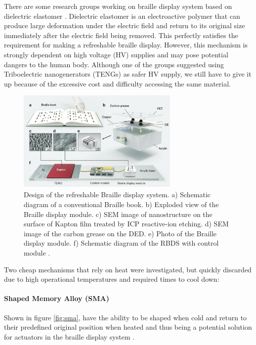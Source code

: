 There are some research groups working on braille display system based on dielectric elastomer \cite{qu_refreshable_2021}.
Dielectric elastomer is an electroactive polymer that can produce large deformation under the electric field and return to its original size immediately after the electric field being removed.
This perfectly satisfies the requirement for making a refreshable braille display.
However, this mechanism is strongly dependent on high voltage (HV) supplies and may pose potential dangers to the human body.
Although one of the groups suggested using Triboelectric nanogenerators (TENGs) as safer HV supply, we still have to give it up because of the excessive cost and difficulty accessing the same material. 

\begin{figure}[h]\centering
    \includegraphics[width=0.7\textwidth]{figures/teng.png}
    \caption[Dielectric elastomer Braille display]{Design of the refreshable Braille display system. a) Schematic diagram of a conventional Braille book. b) Exploded view of the Braille display module. c) SEM image of nanostructure on the surface of Kapton film treated by ICP reactive-ion etching. d) SEM image of the carbon grease on the DED. e) Photo of the Braille display module. f) Schematic diagram of the RBDS with control module \cite{qu_refreshable_2021}.}
    \label{fig:teng.png}
\end{figure}

Two cheap mechanisms that rely on heat were investigated, but quickly discarded due to high operational temperatures and required times to cool down:

\paragraph{Shaped Memory Alloy (SMA)}
Shown in figure \ref{fig:sma}, have the ability to be shaped when cold and return to their predefined original position when heated and thus being a potential solution for actuators in the braille display system \cite{chaves_microtuators_2009}.

